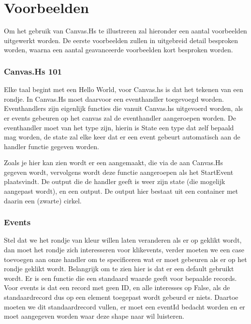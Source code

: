 \section{Voorbeelden}
Om het gebruik van Canvas.Hs te illustreren zal hieronder een aantal voorbeelden uitgewerkt worden. De eerste voorbeelden zullen in uitgebreid detail besproken worden, waarna een aantal geavanceerde voorbeelden kort besproken worden.

\subsubsection{Canvas.Hs 101}
Elke taal begint met een Hello World, voor Canvas.hs is dat het tekenen van een rondje. In Canvas.Hs moet daarvoor een eventhandler toegevoegd worden. Eventhandlers zijn eigenlijk functies die vanuit Canvas.hs uitgevoerd worden, als er events gebeuren op het canvas zal de eventhandler aangeroepen worden. De eventhandler moet van het type  zijn, hierin is State een type dat zelf bepaald mag worden, de state zal elke keer dat er een event gebeurt automatisch aan de handler functie gegeven worden.



Zoals je hier kan zien wordt er een  aangemaakt, die via de  aan Canvas.Hs gegeven wordt, vervolgens wordt deze functie aangeroepen als het StartEvent plaatsvindt. De output die de handler geeft is weer zijn state (die mogelijk aangepast wordt), en een output. De output hier bestaat uit een container met daarin een (zwarte) cirkel.

\subsubsection{Events}
Stel dat we het rondje van kleur willen laten veranderen als er op geklikt wordt, dan moet het rondje zich interesseren voor klikevents, verder moeten we een case toevoegen aan onze handler om te specificeren wat er moet gebeuren als er op het rondje geklikt wordt. Belangrijk om te zien hier is dat er een default gebruikt wordt. Er is een functie die een standaard waarde geeft voor bepaalde records. Voor events is dat een record met geen ID, en alle interesses op False, als de standaardrecord dus op een element toegepast wordt gebeurd er niets. Daartoe moeten we dit standaardrecord vullen, er moet een eventId bedacht worden en er moet aangegeven worden waar deze shape naar wil luisteren.

